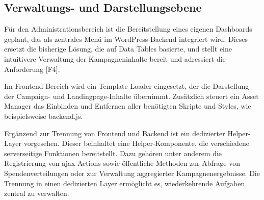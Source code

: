 \subsection{Verwaltungs- und Darstellungsebene}
Für den Administrationsbereich ist die Bereitstellung eines eigenen Dashboards geplant, das als zentrales Menü im WordPress-Backend integriert wird.
Dieses ersetzt die bisherige Lösung, die auf Data Tables basierte, und stellt eine intuitivere Verwaltung der Kampagneninhalte bereit und adressiert die Anforderung [F4].

Im Frontend-Bereich wird ein Template Loader eingesetzt, der die Darstellung der Campaign- und Landingpage-Inhalte übernimmt.
Zusätzlich steuert ein Asset Manager das Einbinden und Entfernen aller benötigten Skripte und Styles, wie beispielsweise backend.js.

Ergänzend zur Trennung von Frontend und Backend ist ein dedizierter Helper-Layer vorgesehen.
Dieser beinhaltet eine Helper-Komponente, die verschiedene serverseitige Funktionen bereitstellt.
Dazu gehören unter anderem die Registrierung von \gls{ajax}-Actions sowie öffentliche Methoden zur Abfrage von Spendenverteilungen oder zur Verwaltung aggregierter Kampagnenergebnisse.
Die Trennung in einen dedizierten Layer ermöglicht es, wiederkehrende Aufgaben zentral zu verwalten.


%
